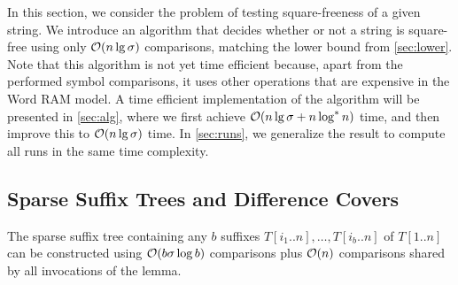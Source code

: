 \label{sec:upper}

In this section, we consider the problem of testing square-freeness of a given string.
We introduce an algorithm that decides whether or not a string is square-free using only $\mathcal{O}(n \lg \sigma)$ comparisons, matching the lower bound from \cref{sec:lower}.
Note that this algorithm is not yet time efficient because, apart from the performed symbol comparisons, it uses other operations that are expensive in the Word RAM model.
A time efficient implementation of the algorithm will be presented in \cref{sec:alg}, where we first achieve $\mathcal{O}(n \lg \sigma + n \log^* n)$ time, and then improve this to $\mathcal{O}(n \lg \sigma)$ time.
In \cref{sec:runs}, we generalize the result to compute all runs in the same time complexity.

\subsection{Sparse Suffix Trees and Difference Covers}

\begin{lemma}
\label{lem:sparse}
The sparse suffix tree containing any $b$ suffixes $T[i_{1}..n], \ldots, T[i_{b}..n]$
of $T[1..n]$ can be constructed using $\mathcal{O}(b\sigma\log b)$ comparisons plus
$\mathcal{O}(n)$ comparisons shared by all invocations of the lemma.
\end{lemma}


